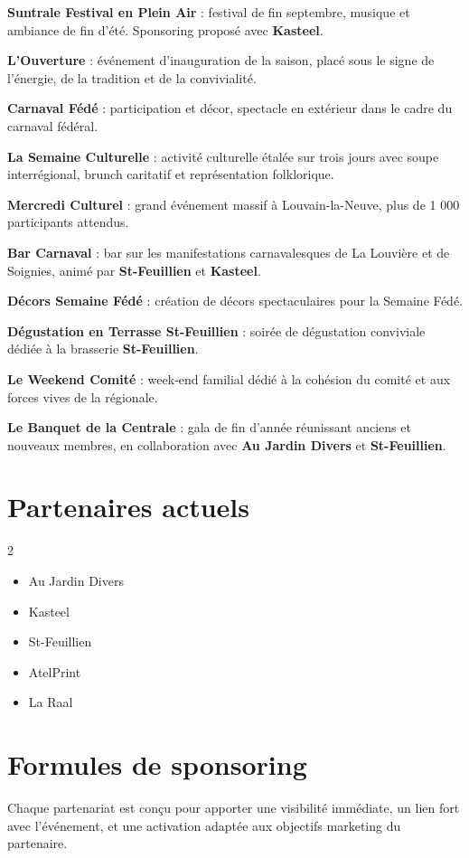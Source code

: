 \documentclass[11pt,a4paper]{scrartcl}
\begin{document}
\textbf{Suntrale Festival en Plein Air} : festival de fin septembre, musique et ambiance de fin d'été. Sponsoring proposé avec \textbf{Kasteel}.

\textbf{L'Ouverture} : événement d'inauguration de la saison, placé sous le signe de l'énergie, de la tradition et de la convivialité.

\textbf{Carnaval Fédé} : participation et décor, spectacle en extérieur dans le cadre du carnaval fédéral.

\textbf{La Semaine Culturelle} : activité culturelle étalée sur trois jours avec soupe interrégional, brunch caritatif et représentation folklorique.

\textbf{Mercredi Culturel} : grand événement massif à Louvain-la-Neuve, plus de 1 000 participants attendus.

\textbf{Bar Carnaval} : bar sur les manifestations carnavalesques de La Louvière et de Soignies, animé par \textbf{St-Feuillien} et \textbf{Kasteel}.

\textbf{Décors Semaine Fédé} : création de décors spectaculaires pour la Semaine Fédé.

\textbf{Dégustation en Terrasse St-Feuillien} : soirée de dégustation conviviale dédiée à la brasserie \textbf{St-Feuillien}.

\textbf{Le Weekend Comité} : week-end familial dédié à la cohésion du comité et aux forces vives de la régionale.

\textbf{Le Banquet de la Centrale} : gala de fin d'année réunissant anciens et nouveaux membres, en collaboration avec \textbf{Au Jardin Divers} et \textbf{St-Feuillien}.

\section{Partenaires actuels}
\begin{multicols}{2}
\begin{itemize}[leftmargin=*]
    \item Au Jardin Divers
    \item Kasteel
    \item St-Feuillien
    \item AtelPrint
    \item La Raal
\end{itemize}
\end{multicols}

\section{Formules de sponsoring}
Chaque partenariat est conçu pour apporter une visibilité immédiate, un lien fort avec l'événement, et une activation adaptée aux objectifs marketing du partenaire.
\end{document}
